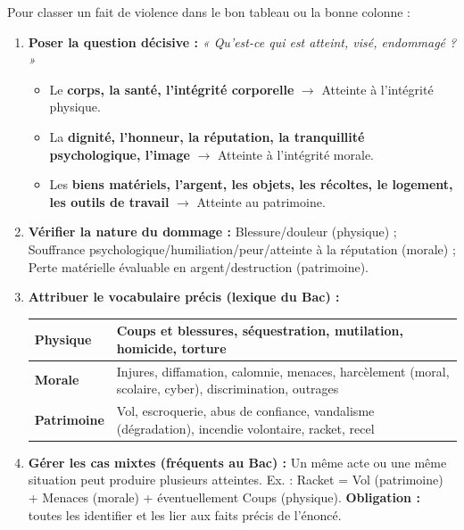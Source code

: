 \documentclass[11pt]{article}
\newcommand{\cle}[1]{{\popxbold\color{popdark}#1}}
\begin{document}
\begin{methode}
Pour classer un fait de violence dans le bon tableau ou la bonne colonne :
\begin{enumerate}
\item \textbf{Poser la question décisive :} \emph{« Qu'est-ce qui est atteint, visé, endommagé ? »}
\begin{itemize}
\item Le \textbf{corps, la santé, l'intégrité corporelle} $\rightarrow$ \cle{Atteinte à l'intégrité physique}.
\item La \textbf{dignité, l'honneur, la réputation, la tranquillité psychologique, l'image} $\rightarrow$ \cle{Atteinte à l'intégrité morale}.
\item Les \textbf{biens matériels, l'argent, les objets, les récoltes, le logement, les outils de travail} $\rightarrow$ \cle{Atteinte au patrimoine}.
\end{itemize}
\item \textbf{Vérifier la nature du dommage :} Blessure/douleur (physique) ; Souffrance psychologique/humiliation/peur/atteinte à la réputation (morale) ; Perte matérielle évaluable en argent/destruction (patrimoine).
\item \textbf{Attribuer le vocabulaire précis (lexique du Bac) :}
\begin{center}
\begin{tabular}{|l|l|}\hline
\textbf{Physique} & Coups et blessures, séquestration, mutilation, homicide, torture \\ \hline
\textbf{Morale} & Injures, diffamation, calomnie, menaces, harcèlement (moral, scolaire, cyber), discrimination, outrages \\ \hline
\textbf{Patrimoine} & Vol, escroquerie, abus de confiance, vandalisme (dégradation), incendie volontaire, racket, recel \\ \hline
\end{tabular}
\end{center}
\item \textbf{Gérer les cas mixtes (fréquents au Bac) :} Un même acte ou une même situation peut produire plusieurs atteintes. Ex. : Racket = Vol (patrimoine) + Menaces (morale) + éventuellement Coups (physique). \textbf{Obligation :} toutes les identifier et les lier aux faits précis de l'énoncé.
\end{enumerate}
\end{methode}
\end{document}
